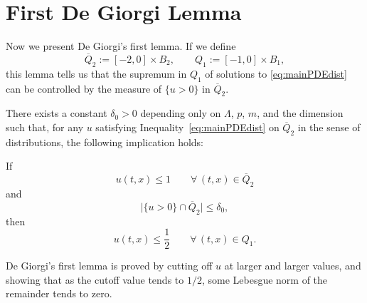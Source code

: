 \section{First De Giorgi Lemma}\label{sec:DG1}

Now we present De Giorgi's first lemma.  
If we define
\[ \overline{Q}_2 := [-2,0]\times B_2, \qquad Q_1 := [-1,0]\times B_1,\]  
this lemma tells us that the supremum in $Q_1$ of solutions to \eqref{eq:mainPDEdist} can be controlled by the measure of $\{u > 0\}$ in $\overline{Q}_2$.  

\begin{proposition} \label{th:DG1}
There exists a constant $\delta_0 > 0$ depending only on $\Lambda$, $p$, $m$, and the dimension such that, for any $u$ satisfying Inequality~\eqref{eq:mainPDEdist} on $\overline{Q}_2$ in the sense of distributions, the following implication holds:

If 
\[ u(t,x) \leq 1 \qquad \forall\, (t,x) \in \overline{Q}_2 \]
and
\[ \big|\{u > 0\} \cap \overline{Q}_2 \big| \leq \delta_0,\] 
%
then 
\[ u(t,x) \leq \frac{1}{2} \qquad \forall \, (t,x) \in Q_1.\]


\end{proposition} 

De Giorgi's first lemma is proved by cutting off $u$ at larger and larger values, and showing that as the cutoff value tends to $1/2$, some Lebesgue norm of the remainder tends to zero.  

